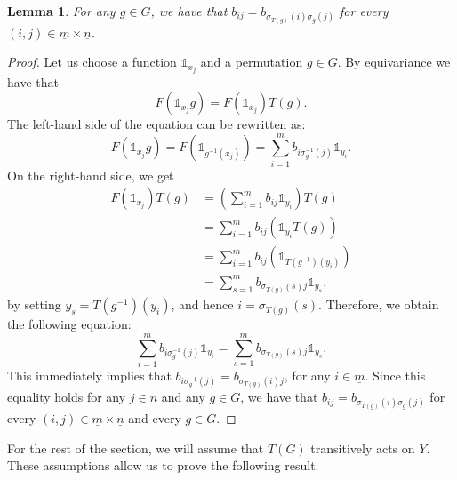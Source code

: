 \documentclass[11pt]{article}
\newtheorem{lemma}[theorem]{Lemma}
\begin{document}
\begin{lemma}\label{rijhm}
For any $g \in G$, we have that $b_{ij}=b_{\sigma_{T(g)}(i)\sigma_g(j)}$ for every $(i,j) \in \underline{m} \times \underline{n}$.
\end{lemma}

\begin{proof}
Let us choose a function ${\mathds{1}}_{x_j}$ and a permutation $g \in G$.
By equivariance we have that
\[{F}({\mathds{1}}_{x_j}g )= {F}({\mathds{1}}_{x_j})T(g).\]
The left-hand side of the equation can be rewritten as:
\[
{F}({\mathds{1}}_{x_j}g )= {F}({\mathds{1}}_{g^{-1}(x_j)} )= \sum_{i=1}^{m}b_{i\sigma_g^{-1}(j)}{\mathds{1}}_{y_i}.
\]
On the right-hand side, we get
\begin{align*}
{F}({\mathds{1}}_{x_j})T(g)&=\left(\sum_{i=1}^{m}b_{ij}{\mathds{1}}_{y_i}\right) T(g)
\\&= \sum_{i=1}^{m}b_{ij}({\mathds{1}}_{y_i}T(g))
\\&= \sum_{i=1}^{m}b_{ij}({\mathds{1}}_{T(g^{-1})(y_i)})
\\&=\sum_{s=1}^{m}b_{\sigma_{T(g)}(s)j}{\mathds{1}}_{y_s},
\end{align*}
by setting $y_s=T(g^{-1})(y_i)$,
{\color{black} and hence $i=\sigma_{T(g)}(s)$.}
Therefore, we obtain the following equation: 
\[
\sum_{i=1}^{m}b_{i\sigma_g^{-1}(j)}{\mathds{1}}_{y_i}=\sum_{s=1}^{m}b_{\sigma_{T(g)}(s)j}{\mathds{1}}_{y_s}.
\]
This immediately implies that $b_{i\sigma_g^{-1}(j)}=b_{\sigma_{T(g)}(i)j}$, for any $i \in \underline{m}$.
Since this equality holds for
any $j \in \underline{n}$ and any $g \in G$, we have that $b_{ij}=b_{\sigma_{T(g)}(i)\sigma_g(j)}$ for every $(i,j) \in \underline{m} \times \underline{n}$ and every $g\in G$.
\end{proof}

For the rest of the section, we will assume that $T(G)$ transitively acts on $Y$. 
These assumptions allow us to prove the following result.
\end{document}
